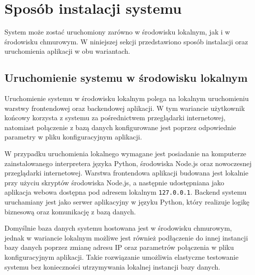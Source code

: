 \documentclass[a4paper,twoside,12pt]{book}
\begin{document}
\section{Sposób instalacji systemu}

System może zostać uruchomiony zarówno w środowisku lokalnym, jak i w środowisku
chmurowym. W niniejszej sekcji przedstawiono sposób instalacji oraz uruchomienia
aplikacji w obu wariantach.

\subsection{Uruchomienie systemu w środowisku lokalnym}

Uruchomienie systemu w środowisku lokalnym polega na lokalnym uruchomieniu warstwy
frontendowej oraz backendowej aplikacji. W tym wariancie użytkownik końcowy
korzysta z systemu za pośrednictwem przeglądarki internetowej, natomiast połączenie
z bazą danych konfigurowane jest poprzez odpowiednie parametry w pliku
konfiguracyjnym aplikacji.

W przypadku uruchomienia lokalnego wymagane jest posiadanie na komputerze
zainstalowanego interpretera języka Python, środowiska Node.js oraz nowoczesnej
przeglądarki internetowej. Warstwa frontendowa aplikacji budowana jest lokalnie
przy użyciu skryptów środowiska Node.js, a następnie udostępniana jako aplikacja
webowa dostępna pod adresem lokalnym \texttt{127.0.0.1}. Backend systemu uruchamiany jest
jako serwer aplikacyjny w języku Python, który realizuje logikę biznesową oraz
komunikację z bazą danych.

Domyślnie baza danych systemu hostowana jest w środowisku chmurowym, jednak w
wariancie lokalnym możliwe jest również podłączenie do innej instancji bazy danych
poprzez zmianę adresu IP oraz parametrów połączenia w pliku konfiguracyjnym
aplikacji. Takie rozwiązanie umożliwia elastyczne testowanie systemu bez
konieczności utrzymywania lokalnej instancji bazy danych.
\end{document}
